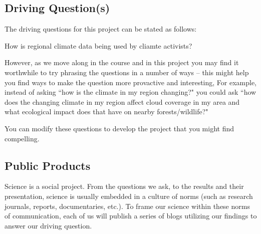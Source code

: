\documentclass{article}\usepackage[]{graphicx}\usepackage[]{color}
\newenvironment{itemize*}%
  {\begin{itemize}%
    \setlength{\itemsep}{0pt}%
    \setlength{\parskip}{0pt}}%
  {\end{itemize}}
\begin{document}
\subsection{Driving Question(s)}

The driving questions for this project can be stated as follows: 

\begin{itemize*}
  \item How is regional climate data being used by cliamte activists?
\end{itemize*}

However, as we move along in the course and in this project you may find it worthwhile to try phrasing the questions in a number of ways -- this might help you find ways to make the question more provactive and interesting, For example, instead of asking ``how is the climate in my region changing?" you could ask ``how does the changing climate in my region affect cloud coverage in my area and what ecological impact does that have on nearby forests/wildlife?"

You can modify these questions to develop the project that you might find compelling.



\subsection{Public Products}

Science is a social project. From the questions we ask, to the results and their presentation, science is usually embedded in a culture of norms (such as research journals, reports, documentaries, etc.). To frame our science within these norms of communication, each of us will publish a series of blogs utilizing our findings to answer our driving question.
\end{document}
